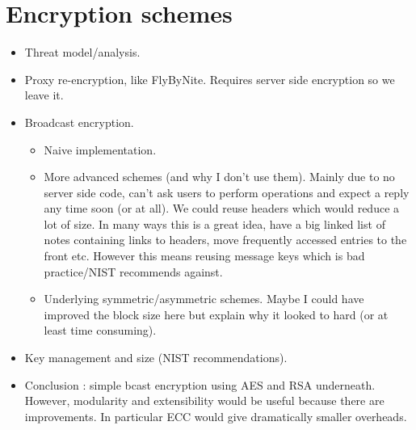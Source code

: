 \section{Encryption schemes}
    \begin{itemize}
        \item Threat model/analysis.
        \item Proxy re-encryption, like FlyByNite. Requires server side encryption so we leave it.
        \item Broadcast encryption.
        \begin{itemize}
            \item Naive implementation.
            \item More advanced schemes (and why I don't use them). Mainly due to no server side code, can't ask users to perform operations and expect a reply any time soon (or at all). We could reuse headers which would reduce a lot of size. In many ways this is a great idea, have a big linked list of notes containing links to headers, move frequently accessed entries to the front etc. However this means reusing message keys which is bad practice/NIST recommends against.
            \item Underlying symmetric/asymmetric schemes. Maybe I could have improved the block size here but explain why it looked to hard (or at least time consuming).
        \end{itemize}
	\item Key management and size (NIST recommendations).
        \item Conclusion : simple bcast encryption using AES and RSA underneath. However, modularity and extensibility would be useful because there are improvements. In particular ECC would give dramatically smaller overheads.
    \end{itemize}

